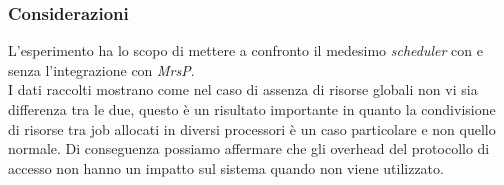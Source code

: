 \subsubsection{Considerazioni}
\label{sec:confronto_norisorsa_cons}

\noindent L'esperimento ha lo scopo di mettere a confronto il medesimo \textit{scheduler} con e senza l'integrazione con \textit{MrsP}.\\

\noindent I dati raccolti mostrano come nel caso di assenza di risorse globali non vi sia differenza tra le due, questo è un risultato importante in quanto la condivisione di risorse tra job allocati in diversi processori è un caso particolare e non quello normale. Di conseguenza possiamo affermare che gli overhead del protocollo di accesso non hanno un impatto sul sistema quando non viene utilizzato.\\